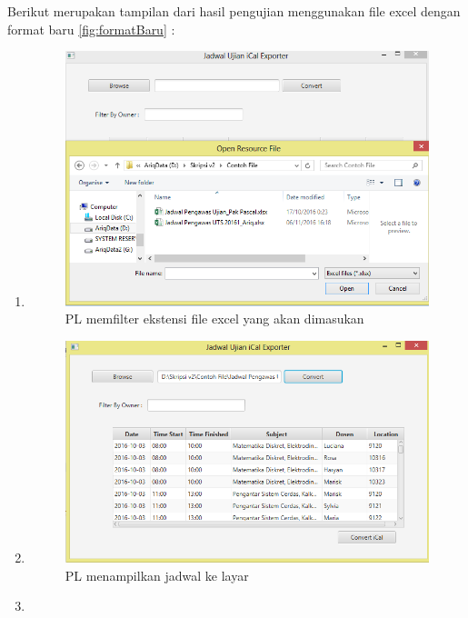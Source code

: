Berikut merupakan tampilan dari hasil pengujian menggunakan file excel dengan format baru \ref{fig:formatBaru} :
\begin{enumerate}
	\item 
		\begin{figure}[H]
		\centering
		\includegraphics[scale=0.7]{Gambar/filterExtension}
		\caption{PL memfilter ekstensi file excel yang akan dimasukan}
		\label{fig:filterExtension}
		\end{figure}
	\item 
		\begin{figure}[H]
		\centering
		\includegraphics[scale=0.7]{Gambar/jadwalKeLayarEksperimental}
		\caption{PL menampilkan jadwal ke layar}
		\label{fig:jadwalKeLayarEksperimental}
		\end{figure}
	\item 
		\begin{figure}[H]
		\centering

\end{figure}
\end{enumerate}
